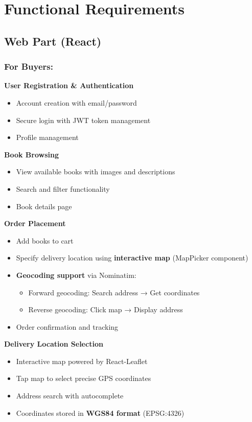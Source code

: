 \documentclass[12pt,a4paper]{article}
\begin{document}
\newpage

\section{Functional Requirements}

\subsection{Web Part (React)}

\subsubsection{For Buyers:}

\textbf{User Registration \& Authentication}
\begin{itemize}
    \item Account creation with email/password
    \item Secure login with JWT token management
    \item Profile management
\end{itemize}

\textbf{Book Browsing}
\begin{itemize}
    \item View available books with images and descriptions
    \item Search and filter functionality
    \item Book details page
\end{itemize}

\textbf{Order Placement}
\begin{itemize}
    \item Add books to cart
    \item Specify delivery location using \textbf{interactive map} (MapPicker component)
    \item \textbf{Geocoding support} via Nominatim:
    \begin{itemize}
        \item Forward geocoding: Search address → Get coordinates
        \item Reverse geocoding: Click map → Display address
    \end{itemize}
    \item Order confirmation and tracking
\end{itemize}

\textbf{Delivery Location Selection}
\begin{itemize}
    \item Interactive map powered by React-Leaflet
    \item Tap map to select precise GPS coordinates
    \item Address search with autocomplete
    \item Coordinates stored in \textbf{WGS84 format} (EPSG:4326)
\end{itemize}
\end{document}
